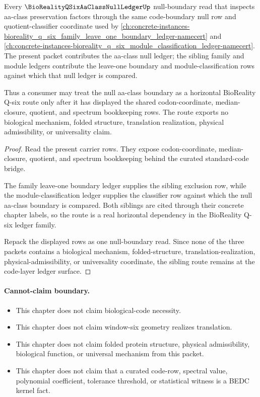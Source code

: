 \begin{theorem}
\label{thm:bioreality-q-six-aa-class-null-ledger-sibling-route}
Every $\BioRealityQSixAaClassNullLedgerUp$ null-boundary read that inspects aa-class preservation factors through the same code-boundary null row and quotient-classifier coordinate used by \autoref{ch:concrete-instances-bioreality_q_six_family_leave_one_boundary_ledger-namecert} and \autoref{ch:concrete-instances-bioreality_q_six_module_classification_ledger-namecert}. The present packet contributes the aa-class null ledger; the sibling family and module ledgers contribute the leave-one boundary and module-classification rows against which that null ledger is compared.

Thus a consumer may treat the null aa-class boundary as a horizontal BioReality Q-six route only after it has displayed the shared codon-coordinate, median-closure, quotient, and spectrum bookkeeping rows. The route exports no biological mechanism, folded structure, translation realization, physical admissibility, or universality claim.
\end{theorem}
\begin{proof}
Read the present carrier rows. They expose codon-coordinate, median-closure, quotient, and spectrum bookkeeping behind the curated standard-code bridge.

The family leave-one boundary ledger supplies the sibling exclusion row, while the module-classification ledger supplies the classifier row against which the null aa-class boundary is compared. Both siblings are cited through their concrete chapter labels, so the route is a real horizontal dependency in the BioReality Q-six ledger family.

Repack the displayed rows as one null-boundary read. Since none of the three packets contains a biological mechanism, folded-structure, translation-realization, physical-admissibility, or universality coordinate, the sibling route remains at the code-layer ledger surface.
\end{proof}

\paragraph{Cannot-claim boundary.}
\begin{itemize}
  \item This chapter does not claim biological-code necessity.
  \item This chapter does not claim window-six geometry realizes translation.
  \item This chapter does not claim folded protein structure, physical admissibility, biological function, or universal mechanism from this packet.
  \item This chapter does not claim that a curated code-row, spectral value, polynomial coefficient, tolerance threshold, or statistical witness is a BEDC kernel fact.
\end{itemize}

